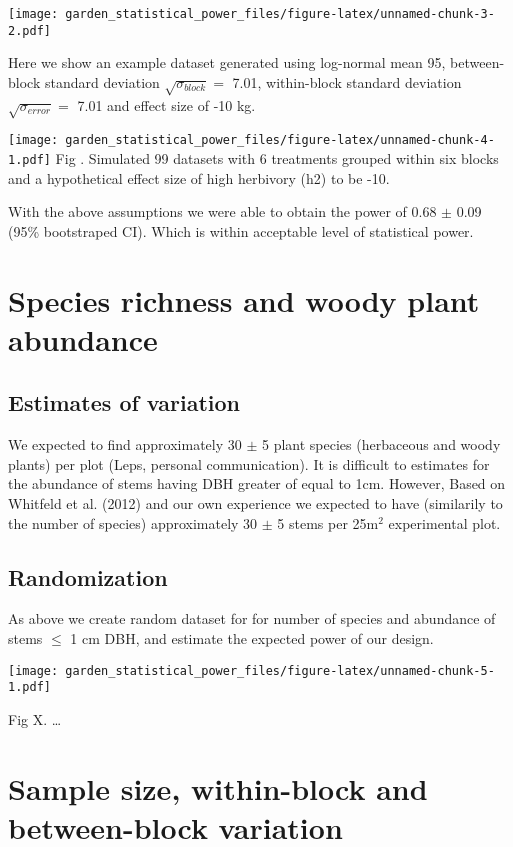 \documentclass[]{article}
\begin{document}
\texttt{[image: garden\_statistical\_power\_files/figure-latex/unnamed-chunk-3-2.pdf]}

Here we show an example dataset generated using log-normal mean 95,
between-block standard deviation \(\sqrt{\sigma_{block}} =\) 7.01,
within-block standard deviation \(\sqrt{\sigma_{error}}=\) 7.01 and
effect size of -10 kg.

\texttt{[image: garden\_statistical\_power\_files/figure-latex/unnamed-chunk-4-1.pdf]}
Fig . Simulated 99 datasets with 6 treatments grouped within six blocks
and a hypothetical effect size of high herbivory (h2) to be -10.

With the above assumptions we were able to obtain the power of 0.68
\(\pm\) 0.09 (95\% bootstraped CI). Which is within acceptable level of
statistical power.

\section{Species richness and woody plant
abundance}\label{species-richness-and-woody-plant-abundance}

\subsection{Estimates of variation}\label{estimates-of-variation-1}

We expected to find approximately 30 \(\pm\) 5 plant species (herbaceous
and woody plants) per plot (Leps, personal communication). It is
difficult to estimates for the abundance of stems having DBH greater of
equal to 1cm. However, Based on Whitfeld et al. (2012) and our own
experience we expected to have (similarily to the number of species)
approximately 30 \(\pm\) 5 stems per 25m\(^2\) experimental plot.

\subsection{Randomization}\label{randomization-1}

As above we create random dataset for for number of species and
abundance of stems \(\leq\) 1 cm DBH, and estimate the expected power of
our design.

\texttt{[image: garden\_statistical\_power\_files/figure-latex/unnamed-chunk-5-1.pdf]}

Fig X. \ldots{}

\section{Sample size, within-block and between-block
variation}\label{sample-size-within-block-and-between-block-variation}
\end{document}
